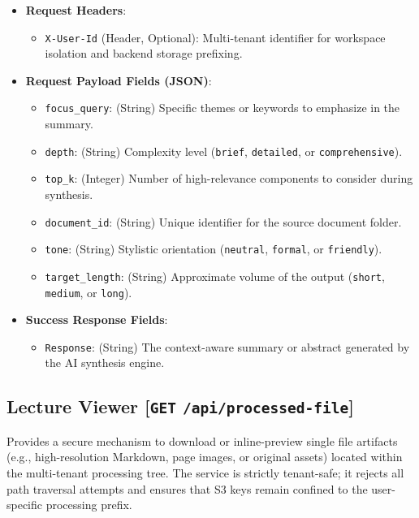 \begin{itemize}
    \item \textbf{Request Headers}:
    \begin{itemize}
        \item \texttt{X-User-Id} (Header, Optional): Multi-tenant identifier for workspace isolation and backend storage prefixing.
    \end{itemize}
    \item \textbf{Request Payload Fields (JSON)}:
    \begin{itemize}
        \item \texttt{focus\_query}: (String) Specific themes or keywords to emphasize in the summary.
        \item \texttt{depth}: (String) Complexity level (\texttt{brief}, \texttt{detailed}, or \texttt{comprehensive}).
        \item \texttt{top\_k}: (Integer) Number of high-relevance components to consider during synthesis.
        \item \texttt{document\_id}: (String) Unique identifier for the source document folder.
        \item \texttt{tone}: (String) Stylistic orientation (\texttt{neutral}, \texttt{formal}, or \texttt{friendly}).
        \item \texttt{target\_length}: (String) Approximate volume of the output (\texttt{short}, \texttt{medium}, or \texttt{long}).
    \end{itemize}
    \item \textbf{Success Response Fields}:
    \begin{itemize}
        \item \texttt{Response}: (String) The context-aware summary or abstract generated by the AI synthesis engine.
    \end{itemize}
\end{itemize}

\subsection{Lecture Viewer [\texttt{GET} \texttt{/api/processed-file}]}
Provides a secure mechanism to download or inline-preview single file artifacts (e.g., high-resolution Markdown, page images, or original assets) located within the multi-tenant processing tree. The service is strictly tenant-safe; it rejects all path traversal attempts and ensures that S3 keys remain confined to the user-specific processing prefix.

